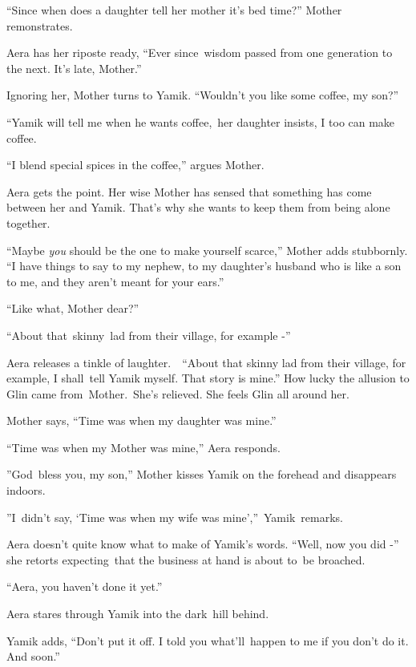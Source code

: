 \documentclass[letterpaper]{article}
\begin{document}
{}``Since when does a daughter tell her mother it's bed time?''  Mother remonstrates.

Aera has her riposte ready, ``Ever since~wisdom passed from one generation to the next. It's late, Mother.'' 

Ignoring her, Mother turns to Yamik. {}``Wouldn't you like some coffee, my son?''\ 

{}``Yamik will tell me when he wants coffee,{\textquotedbl}\ her daughter insists, {\textquotedbl}I too can make
coffee.{\textquotedbl}

{}``I blend special spices in the coffee,'' argues Mother. 

Aera gets the point. Her wise Mother has sensed that something has come between her and Yamik. That's why she wants to
keep them from being alone together. 

{}``Maybe \textit{you} should be the one to make yourself scarce,'' Mother adds stubbornly. ``I have things to say to my
nephew, to my daughter's husband who is like a son to me, and they aren't meant for your ears.'' 

{}``Like what, Mother dear?'' 

{}``About that\ skinny\textcolor[rgb]{0.0,0.4392157,0.7529412}{\ }lad from their village, for example -{}'' 

Aera releases a tinkle of laughter.\ ~``About that skinny lad from their village, for example, I shall~tell Yamik
myself. That story is mine.'' How lucky the allusion to Glin came from\ Mother.\ She{}'s relieved. She feels Glin all
around her. 

Mother says, ``Time was when my daughter was mine.'' 

 ``Time was when my Mother was mine,{}'' Aera responds.

{}''God\ bless you, my son,'' Mother kisses Yamik on the forehead and disappears indoors.

{}''I\ didn't say, `Time was when my wife was mine',{}''\ Yamik\ remarks.

Aera doesn't quite know what to make of Yamik's words. ``Well, now you did\textcolor[rgb]{0.0,0.4392157,0.7529412}{
-}{}'' she retorts expecting\ that the business at hand is about to~be broached. 

{}``Aera, you haven't done it yet.''~ 

Aera stares through Yamik into the dark\ hill behind. 

Yamik adds, {}``Don't put it off. I told you what{}'ll\ happen to me if you don't do it. And soon.'' 
\end{document}
